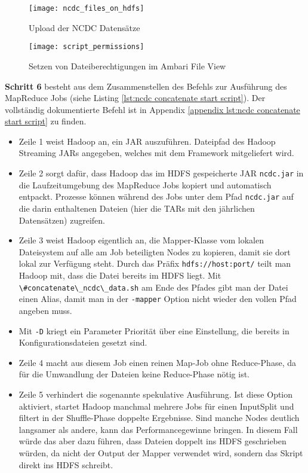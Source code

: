 \begin{figure}[ht]
    \centering
    \texttt{[image: ncdc\_files\_on\_hdfs]}
    \caption[Upload der NCDC Datensätze]{Upload der NCDC Datensätze}
    \label{fig:ncdc files hdfs}
    \texttt{[image: script\_permissions]}
    \caption[Setzen von Dateiberechtigungen im Ambari File View]{Setzen von Dateiberechtigungen im Ambari File View}
    \label{fig:concat script permissions}
\end{figure}

\textbf{Schritt 6} besteht aus dem Zusammenstellen des Befehls zur Ausführung des MapReduce Jobs (siehe Listing \ref{lst:ncdc concatenate start script}). Der vollständig dokumentierte Befehl ist in Appendix \ref{appendix lst:ncdc concatenate start script} zu finden. 
\begin{itemize}
    \item Zeile 1 weist Hadoop an, ein JAR auszuführen. Dateipfad des Hadoop Streaming JARs angegeben, welches mit dem Framework mitgeliefert wird.
    \item Zeile 2 sorgt dafür, dass Hadoop das im HDFS gespeicherte JAR \verb|ncdc.jar| in die Laufzeitumgebung des MapReduce Jobs kopiert und automatisch entpackt. Prozesse können während des Jobs unter dem Pfad \verb|ncdc.jar| auf die darin enthaltenen Dateien (hier die TARs mit den jährlichen Datensätzen) zugreifen.
    \item Zeile 3 weist Hadoop eigentlich an, die Mapper-Klasse vom lokalen Dateisystem auf alle am Job beteiligten Nodes zu kopieren, damit sie dort lokal zur Verfügung steht. Durch das Präfix \verb|hdfs://host:port/| teilt man Hadoop mit, dass die Datei bereits im HDFS liegt. Mit \verb|\#concatenate\_ncdc\_data.sh| am Ende des Pfades gibt man der Datei einen Alias, damit man in der \verb|-mapper| Option nicht wieder den vollen Pfad angeben muss.      
    \item Mit \verb|-D| kriegt ein Parameter Priorität über eine Einstellung, die bereits in Konfigurationsdateien gesetzt sind.
    \item Zeile 4 macht aus diesem Job einen reinen Map-Job ohne Reduce-Phase, da für die Umwandlung der Dateien keine Reduce-Phase nötig ist.
    \item Zeile 5 verhindert die sogenannte spekulative Ausführung. Ist diese Option aktiviert, startet Hadoop manchmal mehrere Jobs für einen InputSplit und filtert in der Shuffle-Phase doppelte Ergebnisse. Sind manche Nodes deutlich langsamer als andere, kann das Performancegewinne bringen. In diesem Fall würde das aber dazu führen, dass Dateien doppelt ins HDFS geschrieben würden, da nicht der Output der Mapper verwendet wird, sondern das Skript direkt ins HDFS schreibt.

\end{itemize}
